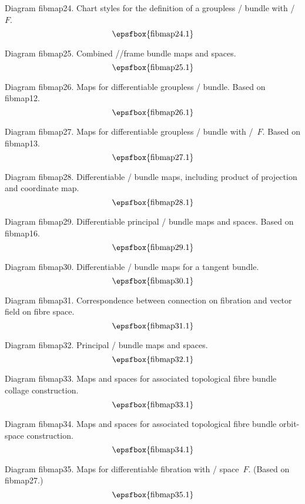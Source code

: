Diagram fibmap24. Chart styles for the definition of a groupless \fibre/ bundle
with \fibre/~$F$.
$$
\centerline{\epsfbox{fibmap24.1}}
$$

\filleject

Diagram fibmap25. Combined \fibre//frame bundle maps and spaces.
$$
\centerline{\epsfbox{fibmap25.1}}
$$

Diagram fibmap26. Maps for differentiable groupless \fibre/ bundle. Based on
fibmap12.
$$
\centerline{\epsfbox{fibmap26.1}}
$$

Diagram fibmap27. Maps for differentiable groupless \fibre/ bundle with
\fibre/~$F$. Based on fibmap13.
$$
\centerline{\epsfbox{fibmap27.1}}
$$

\filleject

Diagram fibmap28. Differentiable \fibre/ bundle maps, including product of
projection and coordinate map.
$$
\centerline{\epsfbox{fibmap28.1}}
$$

Diagram fibmap29. Differentiable principal \fibre/ bundle maps and spaces. Based
on fibmap16.
$$
\centerline{\epsfbox{fibmap29.1}}
$$

\filleject

Diagram fibmap30. Differentiable \fibre/ bundle maps for a tangent bundle.
$$
\centerline{\epsfbox{fibmap30.1}}
$$

Diagram fibmap31. Correspondence between connection on fibration and vector
field on fibre space.
$$
\centerline{\epsfbox{fibmap31.1}}
$$

Diagram fibmap32. Principal \fibre/ bundle maps and spaces.
$$
\centerline{\epsfbox{fibmap32.1}}
$$

\filleject

Diagram fibmap33. Maps and spaces for associated topological fibre bundle
collage construction.
$$
\centerline{\epsfbox{fibmap33.1}}
$$

Diagram fibmap34. Maps and spaces for associated topological fibre bundle
orbit-space construction.
$$
\centerline{\epsfbox{fibmap34.1}}
$$

Diagram fibmap35. Maps for differentiable fibration with \fibre/ space~$F$.
(Based on fibmap27.)
$$
\centerline{\epsfbox{fibmap35.1}}
$$

\filleject

